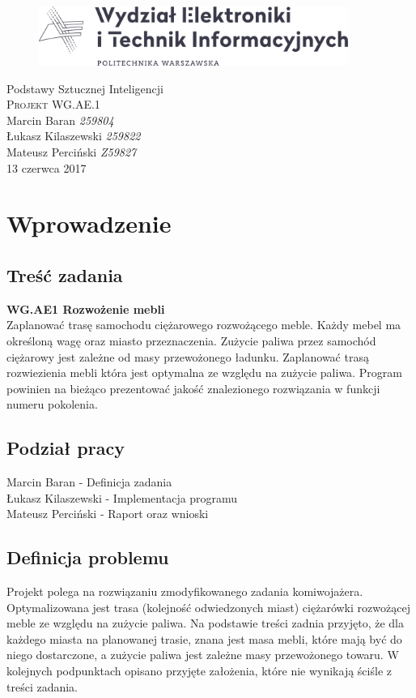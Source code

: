 \documentclass[12pt, oneside, final]{report}
\begin{document}
\begin{titlepage}
	\centering
	\begin{figure}
		\centering
		\includegraphics[width=0.9\textwidth]{logo.pdf}
	\end{figure}
	\vspace*{100pt}
	\LARGE{Podstawy Sztucznej Inteligencji}\\
	\vspace{30pt}
	\textsc{\Huge{Projekt WG.AE.1}}\\
	\vspace{120pt}
	\Large{Marcin Baran \textit{259804}}\\
	\Large{Łukasz Kilaszewski \textit{259822}}\\
	\Large{Mateusz Perciński \textit{Z59827}}\\
	\vfill
	\large{13 czerwca 2017}
\end{titlepage}

\thispagestyle{empty}
\tableofcontents
\cleardoublepage

\chapter{Wprowadzenie}
\section*{Treść zadania}
\textbf{WG.AE1 Rozwożenie mebli} \\
Zaplanować trasę samochodu ciężarowego rozwożącego meble. Każdy mebel ma określoną
wagę oraz miasto przeznaczenia. Zużycie paliwa przez samochód ciężarowy jest zależne od
masy przewożonego ładunku. Zaplanować trasą rozwiezienia mebli która jest optymalna ze
względu na zużycie paliwa. Program powinien na bieżąco prezentować jakość znalezionego
rozwiązania w funkcji numeru pokolenia.
\section*{Podział pracy}
Marcin Baran - Definicja zadania\\
Łukasz Kilaszewski - Implementacja programu\\
Mateusz Perciński - Raport oraz wnioski

\section{Definicja problemu}
Projekt polega na rozwiązaniu zmodyfikowanego zadania komiwojażera. Optymalizowana jest trasa (kolejność odwiedzonych miast) ciężarówki rozwożącej meble ze względu na zużycie paliwa. Na podstawie treści zadnia przyjęto, że dla każdego miasta na planowanej trasie, znana jest masa mebli, które mają być do niego dostarczone, a zużycie paliwa jest zależne masy przewożonego towaru. W kolejnych podpunktach opisano przyjęte założenia, które nie wynikają ściśle z treści zadania.
\end{document}
